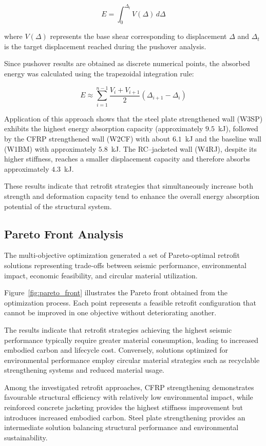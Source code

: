 \documentclass[fleqn,10pt]{wlscirep}
\begin{document}
\[
E = \int_{0}^{\Delta_t} V(\Delta)\, d\Delta
\]

where $V(\Delta)$ represents the base shear corresponding to displacement $\Delta$ and $\Delta_t$ is the target displacement reached during the pushover analysis.

Since pushover results are obtained as discrete numerical points, the absorbed energy was calculated using the trapezoidal integration rule:

\[
E \approx \sum_{i=1}^{n-1}
\frac{V_i + V_{i+1}}{2}
(\Delta_{i+1}-\Delta_i)
\]

Application of this approach shows that the steel plate strengthened wall (W3SP) exhibits the highest energy absorption capacity (approximately $9.5$~kJ), followed by the CFRP strengthened wall (W2CF) with about $6.1$~kJ and the baseline wall (W1BM) with approximately $5.8$~kJ. 
The RC–jacketed wall (W4RJ), despite its higher stiffness, reaches a smaller displacement capacity and therefore absorbs approximately $4.3$~kJ.

These results indicate that retrofit strategies that simultaneously increase both strength and deformation capacity tend to enhance the overall energy absorption potential of the structural system.

\subsection{Pareto Front Analysis}
\label{sec:pareto_analysis}

The multi-objective optimization generated a set of Pareto-optimal
retrofit solutions representing trade-offs between seismic
performance, environmental impact, economic feasibility,
and circular material utilization.

Figure~\ref{fig:pareto_front} illustrates the Pareto front obtained
from the optimization process. Each point represents a feasible
retrofit configuration that cannot be improved in one objective
without deteriorating another.

The results indicate that retrofit strategies achieving the
highest seismic performance typically require greater material
consumption, leading to increased embodied carbon and lifecycle
cost. Conversely, solutions optimized for environmental
performance employ circular material strategies such as
recyclable strengthening systems and reduced material usage.

Among the investigated retrofit approaches, CFRP strengthening
demonstrates favourable structural efficiency with relatively
low environmental impact, while reinforced concrete jacketing
provides the highest stiffness improvement but introduces
increased embodied carbon. Steel plate strengthening provides
an intermediate solution balancing structural performance and
environmental sustainability.
\end{document}
